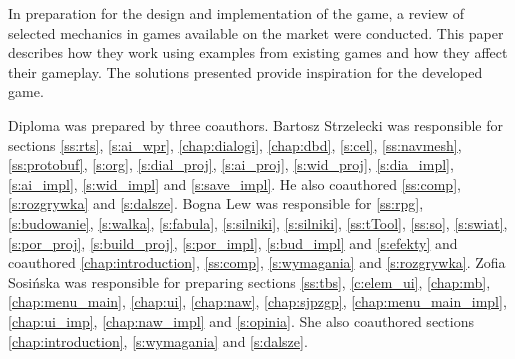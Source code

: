 In preparation for the design and implementation of the game, a review of selected mechanics in games available
on the market were conducted. This paper describes how they work using examples from existing games and how
they affect their gameplay. The solutions presented provide inspiration for the developed game.

Diploma was prepared by three coauthors. Bartosz Strzelecki was responsible for sections \ref{ss:rts},
\ref{s:ai_wpr}, \ref{chap:dialogi}, \ref{chap:dbd}, \ref{s:cel}, \ref{ss:navmesh}, \ref{ss:protobuf}, \ref{s:org},
\ref{s:dial_proj}, \ref{s:ai_proj}, \ref{s:wid_proj}, \ref{s:dia_impl}, \ref{s:ai_impl}, \ref{s:wid_impl} and
\ref{s:save_impl}. He also coauthored \ref{ss:comp}, \ref{s:rozgrywka} and \ref{s:dalsze}. Bogna Lew
was responsible for \ref{ss:rpg}, \ref{s:budowanie}, \ref{s:walka}, \ref{s:fabula}, \ref{s:silniki}, \ref{s:silniki},
\ref{ss:tTool}, \ref{ss:so}, \ref{s:swiat}, \ref{s:por_proj}, \ref{s:build_proj}, \ref{s:por_impl}, \ref{s:bud_impl} and
\ref{s:efekty} and coauthored \ref{chap:introduction}, \ref{ss:comp}, \ref{s:wymagania} and \ref{s:rozgrywka}.
Zofia Sosińska was responsible for preparing sections \ref{ss:tbs}, \ref{c:elem_ui}, \ref{chap:mb},
\ref{chap:menu_main}, \ref{chap:ui}, \ref{chap:naw}, \ref{chap:sjpzgp}, \ref{chap:menu_main_impl}, \ref{chap:ui_imp},
\ref{chap:naw_impl} and  \ref{s:opinia}. She also coauthored sections \ref{chap:introduction}, \ref{s:wymagania} and \ref{s:dalsze}.
 
